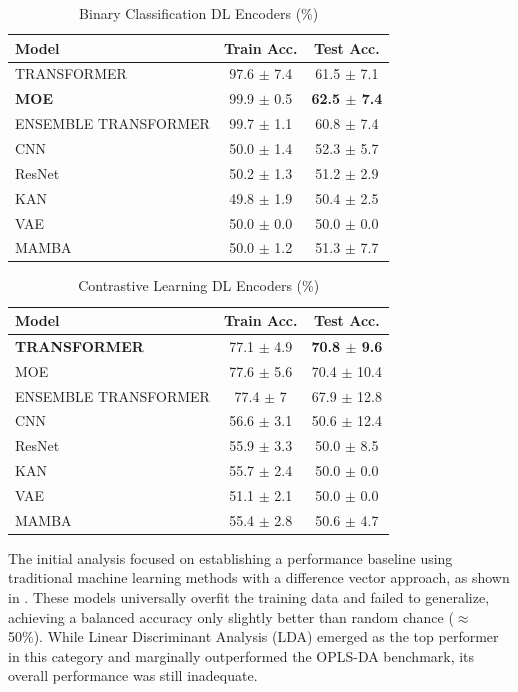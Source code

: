 \begin{table}[H]
    \centering
    \caption{Binary Classification DL Encoders (\%)}
    \label{tab:binary_results_encoders}
    \begin{tabular}{|l|c|c|}
        \hline
        Model & Train Acc. & Test Acc. \\
        \hline
        TRANSFORMER & 97.6 $\pm$ 7.4 & 61.5 $\pm$ 7.1 \\
        \textbf{MOE} & 99.9 $\pm$ 0.5 & \textbf{62.5 $\pm$ 7.4} \\
        ENSEMBLE TRANSFORMER & 99.7 $\pm$ 1.1 & 60.8 $\pm$ 7.4 \\
        CNN & 50.0 $\pm$ 1.4 & 52.3 $\pm$ 5.7 \\
        ResNet & 50.2 $\pm$ 1.3 & 51.2 $\pm$ 2.9 \\
        KAN & 49.8 $\pm$ 1.9 & 50.4 $\pm$ 2.5 \\
        VAE & 50.0 $\pm$ 0.0 & 50.0 $\pm$ 0.0 \\
        MAMBA & 50.0 $\pm$ 1.2 & 51.3 $\pm$ 7.7 \\
        \hline
    \end{tabular}
\end{table}

\begin{table}[H]
    \centering
    \caption{Contrastive Learning DL Encoders (\%)}
    \label{tab:simclr_results_encoders}
    \begin{tabular}{|l|c|c|}
        \hline
        Model & Train Acc. & Test Acc. \\
        \hline
        \textbf{TRANSFORMER} & 77.1 $\pm$ 4.9 & \textbf{70.8 $\pm$ 9.6}\\
        MOE & 77.6 $\pm$ 5.6 & 70.4 $\pm$ 10.4 \\
        ENSEMBLE TRANSFORMER & 77.4 $\pm$ 7 & 67.9 $\pm$ 12.8 \\
        CNN & 56.6 $\pm$ 3.1 & 50.6 $\pm$ 12.4 \\
        ResNet & 55.9 $\pm$ 3.3 & 50.0 $\pm$ 8.5 \\
        KAN & 55.7 $\pm$ 2.4 & 50.0 $\pm$ 0.0 \\
        VAE & 51.1 $\pm$ 2.1 & 50.0 $\pm$ 0.0 \\
        MAMBA & 55.4 $\pm$ 2.8 & 50.6 $\pm$ 4.7 \\
        \hline
    \end{tabular}
\end{table}

The initial analysis focused on establishing a performance baseline using traditional machine learning methods with a difference vector approach, as shown in . These models universally overfit the training data and failed to generalize, achieving a balanced accuracy only slightly better than random chance ($\approx$ 50\%). While Linear Discriminant Analysis (LDA) emerged as the top performer in this category and marginally outperformed the OPLS-DA benchmark, its overall performance was still inadequate.

